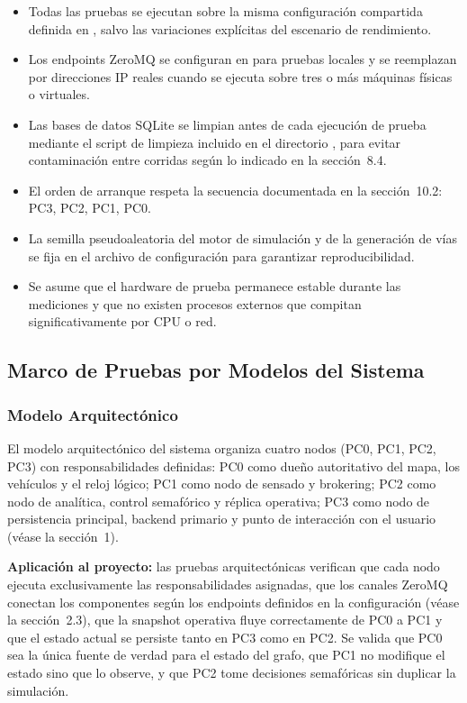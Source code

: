 \documentclass[12pt, a4paper]{article}
\let\oldtexttt\texttt
\renewcommand{\texttt}[1]{\oldtexttt{\seqsplit{#1}}}
\begin{document}
\begin{itemize}
    \item Todas las pruebas se ejecutan sobre la misma configuración compartida definida en \texttt{config/system\_config.json}, salvo las variaciones explícitas del escenario de rendimiento.
    \item Los endpoints ZeroMQ se configuran en \texttt{localhost} para pruebas locales y se reemplazan por direcciones IP reales cuando se ejecuta sobre tres o más máquinas físicas o virtuales.
    \item Las bases de datos SQLite se limpian antes de cada ejecución de prueba mediante el script de limpieza incluido en el directorio \texttt{scripts}, para evitar contaminación entre corridas según lo indicado en la sección~8.4.
    \item El orden de arranque respeta la secuencia documentada en la sección~10.2: PC3, PC2, PC1, PC0.
    \item La semilla pseudoaleatoria del motor de simulación y de la generación de vías se fija en el archivo de configuración para garantizar reproducibilidad.
    \item Se asume que el hardware de prueba permanece estable durante las mediciones y que no existen procesos externos que compitan significativamente por CPU o red.
\end{itemize}

\subsection{Marco de Pruebas por Modelos del Sistema}

\subsubsection{Modelo Arquitectónico}

El modelo arquitectónico del sistema organiza cuatro nodos (PC0, PC1, PC2, PC3) con responsabilidades definidas: PC0 como dueño autoritativo del mapa, los vehículos y el reloj lógico; PC1 como nodo de sensado y brokering; PC2 como nodo de analítica, control semafórico y réplica operativa; PC3 como nodo de persistencia principal, backend primario y punto de interacción con el usuario (véase la sección~1).

\textbf{Aplicación al proyecto:} las pruebas arquitectónicas verifican que cada nodo ejecuta exclusivamente las responsabilidades asignadas, que los canales ZeroMQ conectan los componentes según los endpoints definidos en la configuración (véase la sección~2.3), que la snapshot operativa fluye correctamente de PC0 a PC1 y que el estado actual se persiste tanto en PC3 como en PC2. Se valida que PC0 sea la única fuente de verdad para el estado del grafo, que PC1 no modifique el estado sino que lo observe, y que PC2 tome decisiones semafóricas sin duplicar la simulación.
\end{document}
